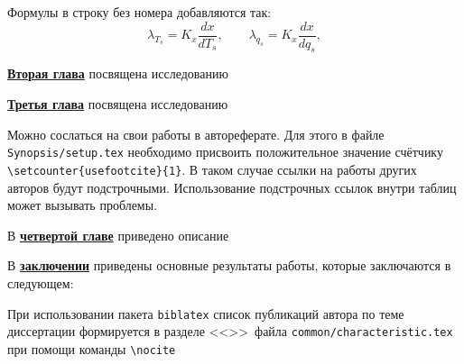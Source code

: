 Формулы в строку без номера добавляются так:
\[
  \lambda_{T_s} = K_x\frac{d{x}}{d{T_s}}, \qquad
  \lambda_{q_s} = K_x\frac{d{x}}{d{q_s}},
\]

\underline{\textbf{Вторая глава}} посвящена исследованию

\underline{\textbf{Третья глава}} посвящена исследованию

Можно сослаться на свои работы в автореферате. Для этого в файле
\verb!Synopsis/setup.tex! необходимо присвоить положительное значение
счётчику \verb!\setcounter{usefootcite}{1}!. В таком случае ссылки на
работы других авторов будут подстрочными.
Использование подстрочных ссылок внутри таблиц может вызывать проблемы.

В \underline{\textbf{четвертой главе}} приведено описание

В \underline{\textbf{заключении}} приведены основные результаты работы, которые заключаются в следующем:


При использовании пакета \verb!biblatex! список публикаций автора по теме
диссертации формируется в разделе <<\publications>>\ файла
\verb!common/characteristic.tex!  при помощи команды \verb!\nocite!

